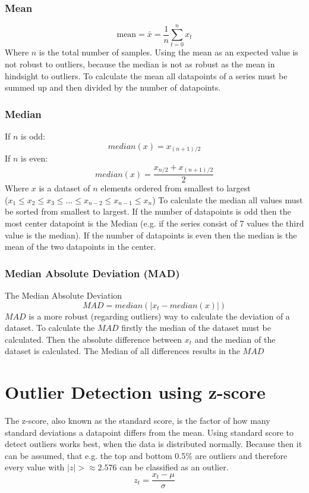 \subsubsection{Mean}
$$
  \text{mean} = \bar{x} = \frac{1}{n} \sum^n_{t=0}x_t
$$
Where $n$ is the total number of samples. Using the mean as an expected value is not robust to outliers, because the median is not as robust as the mean in hindsight to outliers. To calculate the mean all datapoints of a series must be summed up and then divided by the number of datapoints.
\subsubsection{Median}
If $n$ is odd:
$$
  median(x) = x_{(n+1)/2}
$$
If $n$ is even:
$$
  median(x) = \frac{x_{n/2} + x_{(n+1)/2}}{2}
$$
Where $x$ is a dataset of $n$ elements ordered from smallest to largest\\
($x_1 \leq x_2 \leq x_3 \leq \ldots \leq x_{n-2} \leq x_{n-1} \leq x_n$)
\cite{blazquez-garciaReviewOutlierAnomaly2020}
To calculate the median all values must be sorted from smallest to largest. If the number of datapoints is odd then the most center datapoint is the Median (e.g. if the series consist of 7 values the third value is the median). If the number of datapoints is even then the median is the mean of the two datapoints in the center.
\subsubsection{Median Absolute Deviation (\ac{MAD})}
The Median Absolute Deviation 
$$
  MAD = median(|x_t - median(x)|)
$$
$MAD$ is a more robust (regarding outliers) way to calculate the deviation of a dataset. To calculate the $MAD$ firstly the median of the dataset must be calculated. Then the absolute difference between $x_t$ and the median of the dataset is calculated. The Median of all differences results in the $MAD$
\cite{leysDetectingOutliersNot2013, mehrangOutlierDetectionWeight2015}

\section{Outlier Detection using z-score}
The z-score, also known as the standard score, is the factor of how many standard deviations a datapoint differs from the mean. Using standard score to detect outliers works best, when the data is distributed normally. Because then it can be assumed, that e.g. the top and bottom 0.5\% are outliers and therefore every value with $|z| > \approx 2.576$ can be classified as an outlier. %
\begin{equation*}
  z_t = \frac{x_t - \mu}{\sigma}
\end{equation*}

